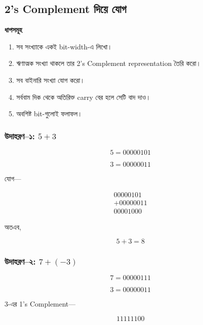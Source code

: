 
\subsection{\textenglish{2's Complement} দিয়ে যোগ}

\par\begingroup

\textbf{ধাপসমূহ}

\begin{enumerate}
    \item সব সংখ্যাকে একই \textenglish{bit-width}-এ লিখো।
    \item ঋণাত্মক সংখ্যা থাকলে তার
    \textenglish{2's Complement representation} তৈরি করো।
    \item সব বাইনারি সংখ্যা যোগ করো।
    \item সর্ববাম দিক থেকে অতিরিক্ত
    \textenglish{carry} বের হলে সেটি বাদ দাও।
    \item অবশিষ্ট \textenglish{bit}-গুলোই ফলাফল।
\end{enumerate}
\par\endgroup


\subsubsection*{উদাহরণ--১: $5+3$}

\[
5=00000101
\]

\[
3=00000011
\]

যোগ—

\[
\begin{array}{r}
00000101\\
+00000011\\
\hline
00001000
\end{array}
\]

অতএব,

\[
\boxed{5+3=8}
\]

\subsubsection*{উদাহরণ--২: $7+(-3)$}

\[
7=00000111
\]

\[
3=00000011
\]

$3$-এর \textenglish{1's Complement}—

\[
11111100
\]

